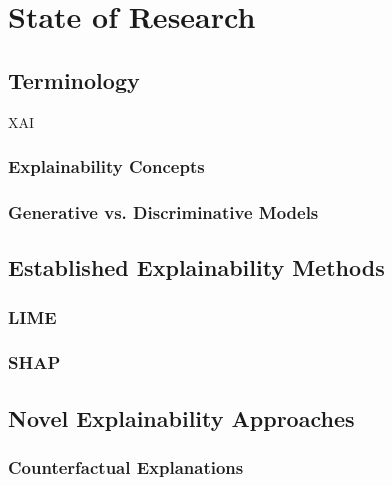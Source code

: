\section{State of Research} \label{sec:state_of_research}

\subsection{Terminology} \label{ssec:terminology}

\ac{XAI}

\subsubsection{Explainability Concepts} \label{sssec:explainability_concepts}

\cite{Arieta2020}

\subsubsection{Generative vs. Discriminative Models} \label{ssec:generative_vs_discriminative_models}

\subsection{Established Explainability Methods} \label{ssec:established_explainability_methods}

\subsubsection{LIME} \label{sssec:lime}

\cite{Ribeiro2016}

\subsubsection{SHAP} \label{sssec:shap}

\cite{Lundberg2017}

\subsection{Novel Explainability Approaches} \label{ssec:novel_explainability_approaches}

\subsubsection{Counterfactual Explanations} \label{sssec:counterfactual_explanations}

